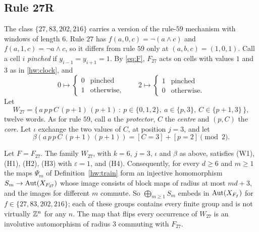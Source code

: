 \subsection{Rule 27R}\label{hw:sec:27}

The class $\{27,83,202,216\}$ carries a version of the rule-$59$ mechanism with windows of length $6$. Rule $27$ has $f(a,0,c)=\lnot(a\land c)$ and $f(a,1,c)=\lnot a\land c$, so it differs from rule $59$ only at $(a,b,c)=(1,0,1)$. Call a cell $i$ \emph{pinched} if $y_{i-1}=y_{i+1}=1$. By \eqref{eq:F}, $F_{27}$ acts on cells with values $1$ and $3$ as in \eqref{hw:clock}, and
\begin{equation}\label{hw:clock27}
0\mapsto\begin{cases}0&\text{pinched}\\1&\text{otherwise,}\end{cases}\qquad 2\mapsto\begin{cases}1&\text{pinched}\\0&\text{otherwise.}\end{cases}
\end{equation}
Let
\[
W_{27}=\{\,a\,p\,p\,C\,(p+1)\,(p+1)\ :\ p\in\{0,1,2\},\ a\in\{p,3\},\ C\in\{p+1,3\}\,\},
\]
twelve words. As for rule $59$, call $a$ the \emph{protector}, $C$ the \emph{centre} and $(p,C)$ the \emph{core}. Let $\iota$ exchange the two values of $C$, at position $j=3$, and let
\[
\beta(a\,p\,p\,C\,(p+1)\,(p+1))=[C=3]+[p=2]\pmod 2.
\]

\begin{theorem}\label{hw:27}
Let $F=F_{27}$. The family $W_{27}$, with $k=6$, $j=3$, $\iota$ and $\beta$ as above, satisfies \textup{(W1)}, \textup{(H1)}, \textup{(H2)}, \textup{(H3)} with $\varepsilon=1$, and \textup{(H4)}. Consequently, for every $d\ge6$ and $m\ge1$ the maps $\Psi_m$ of Definition~\ref{hw:train} form an injective homomorphism $S_m\to\operatorname{Aut}(X_{F_{27}})$ whose image consists of block maps of radius at most $md+3$, and the images for different $m$ commute. So $\bigoplus_{m\ge1}S_m$ embeds in $\operatorname{Aut}(X_{F_f})$ for $f\in\{27,83,202,216\}$; each of these groups contains every finite group and is not virtually $\mathbb{Z}^n$ for any $n$. The map that flips every occurrence of $W_{27}$ is an involutive automorphism of radius $3$ commuting with $F_{27}$.
\end{theorem}

